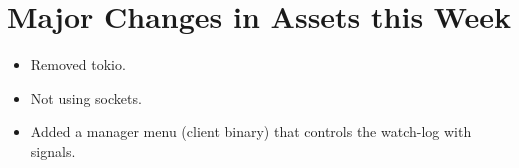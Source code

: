\documentclass{article}
\begin{document}
\section*{Major Changes in Assets this Week}
\begin{itemize}
    \item Removed tokio.
    \item Not using sockets.
    \item Added a manager menu (client binary) that controls the watch-log with
        signals.
\end{itemize}

\end{document}
